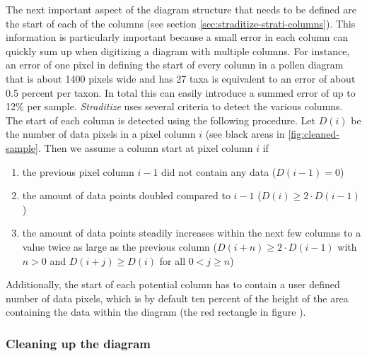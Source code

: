 \documentclass[
11pt, %
english, %
singlespacing, %
headsepline, %
]{MastersDoctoralThesis} %
\begin{document}
\begin{NoHyper}
\begin{refsection}
The next important aspect of the diagram structure that needs to be defined are the start of each of the columns (see section \ref{sec:straditize-strati-columns}). This information is particularly important because a small error in each column can quickly sum up when digitizing a diagram with multiple columns. For instance, an error of one pixel in defining the start of every column in a pollen diagram that is about 1400 pixels wide and has 27 taxa is equivalent to an error of about 0.5 percent per taxon. In total this can easily introduce a summed error of up to 12\% per sample. 
\emph{Straditize} uses several criteria to detect the various columns. The start of each column is detected using the following procedure. Let $D(i)$ be the number of data pixels in a pixel column $i$ (see black areas in \ref{fig:cleaned-sample}. Then we assume a column start at pixel column $i$ if

\begin{enumerate}
	\item the previous pixel column $i-1$ did not contain any data ($D(i-1) = 0$)
	\item the amount of data points doubled compared to $i-1$ ($D(i) \geq 2\cdot D(i-1)$)
	\item the amount of data points steadily increases within the next few columns to a value twice as large as the previous column ($D(i+n) \geq 2\cdot D(i-1)$ with $n>0$ and $D(i+j) \geq D(i)$ for all $0 < j \geq n$)
\end{enumerate}

Additionally, the start of each potential column has to contain a user defined number of data pixels, which is by default ten percent of the height of the area containing the data within the diagram (the red rectangle in figure \samplediagram).

\subsubsection{Cleaning up the diagram}  \label{sec:straditize-cleaning}


\end{refsection}
\end{NoHyper}
\end{document}
